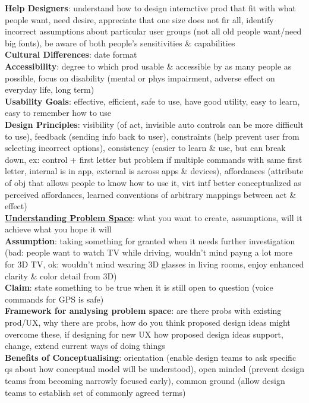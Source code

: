 \documentclass[a4paper]{article}
\begin{document}
\begin{multicols}{3}
        \textbf{Help Designers}: understand how to design interactive prod that fit with what people want, need desire, appreciate that one size does not fir all, identify incorrect assumptions about particular user groups (not all old people want/need big fonts), be aware of both people's sensitivities \& capabilities\\
        \textbf{Cultural Differences}: date format\\
        \textbf{Accessibility}: degree to which prod usable \& accessible by as many people as possible, focus on disability (mental or phys impairment, adverse effect on everyday life, long term)\\
        \textbf{Usability Goals}: effective, efficient, safe to use, have good utility, easy to learn, easy to remember how to use\\
        \textbf{Design Principles}: visibility (of act, invisible auto controls can be more difficult to use), feedback (sending info back to user), constraints (help prevent user from selecting incorrect options), consistency (easier to learn \& use, but can break down, ex: control + first letter but problem if multiple commands with same first letter, internal is in app, external is across apps \& devices), affordances (attribute of obj that allows people to know how to use it, virt intf better conceptualized as perceived affordances, learned conventions of arbitrary mappings between act \& effect)\\
        \underline{\textbf{Understanding Problem Space}}: what you want to create, assumptions, will it achieve what you hope it will\\
        \textbf{Assumption}: taking something for granted when it needs further investigation (bad: people want to watch TV while driving, wouldn't mind payng a lot more for 3D TV, ok: wouldn't mind wearing 3D glasses in living rooms, enjoy enhanced clarity \& color detail from 3D)\\
        \textbf{Claim}: state something to be true when it is still open to question (voice commands for GPS is safe)\\
        \textbf{Framework for analysing problem space}: are there probs with existing prod/UX, why there are probs, how do you think proposed design ideas might overcome these, if designing for new UX how proposed design ideas support, change, extend current ways of doing things\\
        \textbf{Benefits of Conceptualising}: orientation (enable design teams to ask specific qs about how conceptual model will be understood), open minded (prevent design teams from becoming narrowly focused early), common ground (allow design teams to establish set of commonly agreed terms)\\

\end{multicols}
\end{document}
